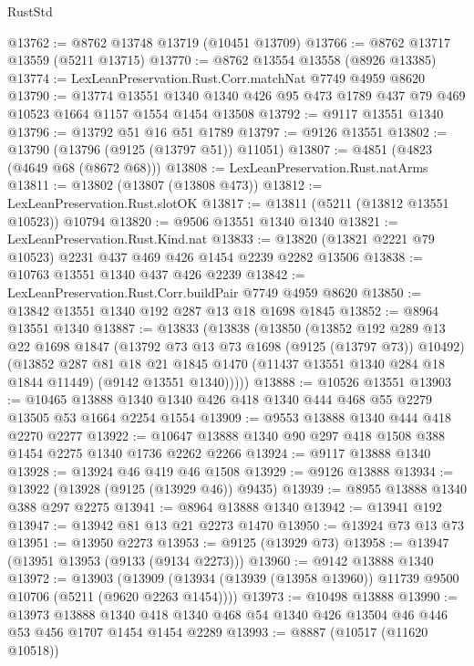 \begin{lexlean}{RustStd}
\begin{coremodule}
@13762 := @8762 @13748 @13719 (@10451 @13709)
@13766 := @8762 @13717 @13559 (@5211 @13715)
@13770 := @8762 @13554 @13558 (@8926 @13385)
@13774 := LexLeanPreservation.Rust.Corr.matchNat @7749 @4959 @8620
@13790 := @13774
    @13551
    @1340
    @1340
    @426
    @95
    @473
    @1789
    @437
    @79
    @469
    @10523
    @1664
    @1157
    @1554
    @1454
    @13508
@13792 := @9117 @13551 @1340
@13796 := @13792 @51 @16 @51 @1789
@13797 := @9126 @13551
@13802 := @13790 (@13796 (@9125 (@13797 @51)) @11051)
@13807 := @4851 (@4823 (@4649 @68 (@8672 @68)))
@13808 := LexLeanPreservation.Rust.natArms
@13811 := @13802 (@13807 (@13808 @473))
@13812 := LexLeanPreservation.Rust.slotOK
@13817 := @13811 (@5211 (@13812 @13551 @10523)) @10794
@13820 := @9506 @13551 @1340 @1340
@13821 := LexLeanPreservation.Rust.Kind.nat
@13833 := @13820 (@13821 @2221 @79 @10523) @2231 @437 @469 @426 @1454 @2239 @2282 @13506
@13838 := @10763 @13551 @1340 @437 @426 @2239
@13842 := LexLeanPreservation.Rust.Corr.buildPair @7749 @4959 @8620
@13850 := @13842 @13551 @1340 @192 @287 @13 @18 @1698 @1845
@13852 := @8964 @13551 @1340
@13887 := @13833
    (@13838
      (@13850
        (@13852
          @192
          @289
          @13
          @22
          @1698
          @1847
          (@13792 @73 @13 @73 @1698 (@9125 (@13797 @73)) @10492)
          (@13852
            @287
            @81
            @18
            @21
            @1845
            @1470
            (@11437 @13551 @1340 @284 @18 @1844 @11449)
            (@9142 @13551 @1340)))))
@13888 := @10526 @13551
@13903 := @10465 @13888 @1340 @1340 @426 @418 @1340 @444 @468 @55 @2279 @13505 @53 @1664 @2254 @1554
@13909 := @9553 @13888 @1340 @444 @418 @2270 @2277
@13922 := @10647 @13888 @1340 @90 @297 @418 @1508 @388 @1454 @2275 @1340 @1736 @2262 @2266
@13924 := @9117 @13888 @1340
@13928 := @13924 @46 @419 @46 @1508
@13929 := @9126 @13888
@13934 := @13922 (@13928 (@9125 (@13929 @46)) @9435)
@13939 := @8955 @13888 @1340 @388 @297 @2275
@13941 := @8964 @13888 @1340
@13942 := @13941 @192
@13947 := @13942 @81 @13 @21 @2273 @1470
@13950 := @13924 @73 @13 @73
@13951 := @13950 @2273
@13953 := @9125 (@13929 @73)
@13958 := @13947 (@13951 @13953 (@9133 (@9134 @2273)))
@13960 := @9142 @13888 @1340
@13972 := @13903
    (@13909 (@13934 (@13939 (@13958 @13960)) @11739 @9500 @10706 (@5211 (@9620 @2263 @1454))))
@13973 := @10498 @13888
@13990 := @13973
    @13888
    @1340
    @418
    @1340
    @468
    @54
    @1340
    @426
    @13504
    @46
    @446
    @53
    @456
    @1707
    @1454
    @1454
    @2289
@13993 := @8887 (@10517 (@11620 @10518))

\end{coremodule}
\end{lexlean}
